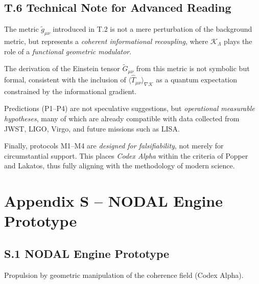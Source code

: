 \documentclass[12pt]{article}
\begin{document}
\subsection*{T.6 Technical Note for Advanced Reading}
The metric $\tilde{g}_{\mu\nu}$ introduced in T.2 is not a mere perturbation of the background metric, but represents a \textit{coherent informational recoupling}, where $\mathcal{K}_\Lambda$ plays the role of a \textit{functional geometric modulator}.

The derivation of the Einstein tensor $\tilde{G}_{\mu\nu}$ from this metric is not symbolic but formal, consistent with the inclusion of $\langle \hat{T}_{\mu\nu} \rangle_{\nabla \mathcal{K}}$ as a quantum expectation constrained by the informational gradient.

Predictions (P1–P4) are not speculative suggestions, but \textit{operational measurable hypotheses}, many of which are already compatible with data collected from JWST, LIGO, Virgo, and future missions such as LISA.

Finally, protocols M1–M4 are \textit{designed for falsifiability}, not merely for circumstantial support. This places \textit{Codex Alpha} within the criteria of Popper and Lakatos, thus fully aligning with the methodology of modern science.

\appendix
\section*{Appendix S – NODAL Engine Prototype}

\subsection*{S.1 NODAL Engine Prototype}
Propulsion by geometric manipulation of the coherence field (Codex Alpha).
\end{document}
